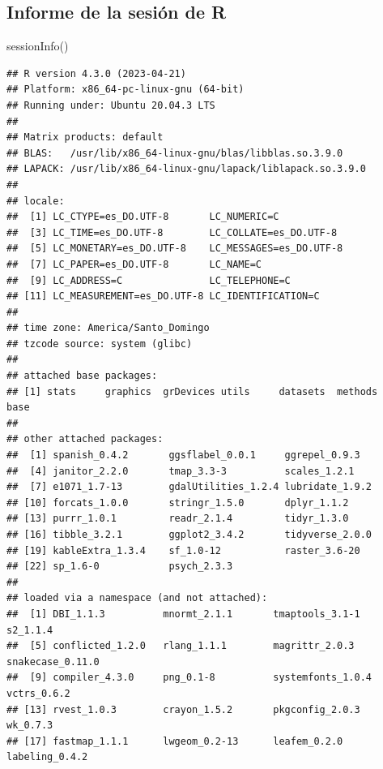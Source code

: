 \documentclass[spanish]{article}
\newenvironment{Shaded}{\begin{snugshade}}{\end{snugshade}}
\newcommand{\FunctionTok}[1]{\textcolor[rgb]{0.00,0.00,0.00}{#1}}
\newcommand{\NormalTok}[1]{#1}
\begin{document}
\hypertarget{informe-de-la-sesiuxf3n-de-r}{%
\subsection*{Informe de la sesión de
R}\label{informe-de-la-sesiuxf3n-de-r}}

\begin{Shaded}
\begin{Highlighting}[]
\FunctionTok{sessionInfo}\NormalTok{()}
\end{Highlighting}
\end{Shaded}

\begin{verbatim}
## R version 4.3.0 (2023-04-21)
## Platform: x86_64-pc-linux-gnu (64-bit)
## Running under: Ubuntu 20.04.3 LTS
## 
## Matrix products: default
## BLAS:   /usr/lib/x86_64-linux-gnu/blas/libblas.so.3.9.0 
## LAPACK: /usr/lib/x86_64-linux-gnu/lapack/liblapack.so.3.9.0
## 
## locale:
##  [1] LC_CTYPE=es_DO.UTF-8       LC_NUMERIC=C              
##  [3] LC_TIME=es_DO.UTF-8        LC_COLLATE=es_DO.UTF-8    
##  [5] LC_MONETARY=es_DO.UTF-8    LC_MESSAGES=es_DO.UTF-8   
##  [7] LC_PAPER=es_DO.UTF-8       LC_NAME=C                 
##  [9] LC_ADDRESS=C               LC_TELEPHONE=C            
## [11] LC_MEASUREMENT=es_DO.UTF-8 LC_IDENTIFICATION=C       
## 
## time zone: America/Santo_Domingo
## tzcode source: system (glibc)
## 
## attached base packages:
## [1] stats     graphics  grDevices utils     datasets  methods   base     
## 
## other attached packages:
##  [1] spanish_0.4.2       ggsflabel_0.0.1     ggrepel_0.9.3      
##  [4] janitor_2.2.0       tmap_3.3-3          scales_1.2.1       
##  [7] e1071_1.7-13        gdalUtilities_1.2.4 lubridate_1.9.2    
## [10] forcats_1.0.0       stringr_1.5.0       dplyr_1.1.2        
## [13] purrr_1.0.1         readr_2.1.4         tidyr_1.3.0        
## [16] tibble_3.2.1        ggplot2_3.4.2       tidyverse_2.0.0    
## [19] kableExtra_1.3.4    sf_1.0-12           raster_3.6-20      
## [22] sp_1.6-0            psych_2.3.3        
## 
## loaded via a namespace (and not attached):
##  [1] DBI_1.1.3          mnormt_2.1.1       tmaptools_3.1-1    s2_1.1.4          
##  [5] conflicted_1.2.0   rlang_1.1.1        magrittr_2.0.3     snakecase_0.11.0  
##  [9] compiler_4.3.0     png_0.1-8          systemfonts_1.0.4  vctrs_0.6.2       
## [13] rvest_1.0.3        crayon_1.5.2       pkgconfig_2.0.3    wk_0.7.3          
## [17] fastmap_1.1.1      lwgeom_0.2-13      leafem_0.2.0       labeling_0.4.2    

\end{verbatim}
\end{document}
